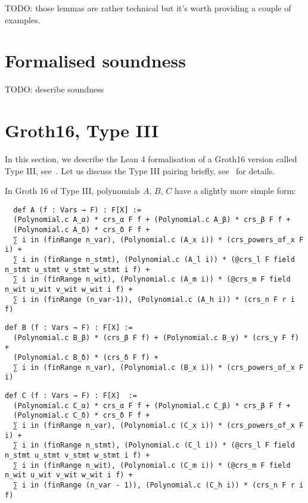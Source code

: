 \documentclass{article}
\theoremstyle{definition}
\theoremstyle{remark}
\begin{document}
TODO: those lemmas are rather technical but it's worth providing a couple of examples.

\section{Formalised soundness}

TODO: describe soundness

\section{Groth16, Type III}

In this section, we describe the Lean 4 formalisation of a Groth16 version called Type III, see~\cite{baghery2021another}.
Let us discuss the Type III pairing briefly, see~\cite{galbraith2008pairings} for details.

In Groth 16 of Type III, polynomials $A$, $B$, $C$ have a slightly more simple form:
\begin{lstlisting}
  def A (f : Vars → F) : F[X] :=
  (Polynomial.c A_α) * crs_α F f + (Polynomial.c A_β) * crs_β F f +
  (Polynomial.c A_δ) * crs_δ F f +
  ∑ i in (finRange n_var), (Polynomial.c (A_x i)) * (crs_powers_of_x F i) +
  ∑ i in (finRange n_stmt), (Polynomial.c (A_l i)) * (@crs_l F field n_stmt u_stmt v_stmt w_stmt i f) +
  ∑ i in (finRange n_wit), (Polynomial.c (A_m i)) * (@crs_m F field n_wit u_wit v_wit w_wit i f) +
  ∑ i in (finRange (n_var-1)), (Polynomial.c (A_h i)) * (crs_n F r i f)
\end{lstlisting}

\begin{lstlisting}
def B (f : Vars → F) : F[X] :=
  (Polynomial.c B_β) * (crs_β F f) + (Polynomial.c B_γ) * (crs_γ F f) +
  (Polynomial.c B_δ) * (crs_δ F f) +
  ∑ i in (finRange n_var), (Polynomial.c (B_x i)) * (crs_powers_of_x F i)
\end{lstlisting}

\begin{lstlisting}
def C (f : Vars → F) : F[X]  :=
  (Polynomial.c C_α) * crs_α F f + (Polynomial.c C_β) * crs_β F f +
  (Polynomial.c C_δ) * crs_δ F f +
  ∑ i in (finRange n_var), (Polynomial.c (C_x i)) * (crs_powers_of_x F i) +
  ∑ i in (finRange n_stmt), (Polynomial.c (C_l i)) * (@crs_l F field n_stmt u_stmt v_stmt w_stmt i f) +
  ∑ i in (finRange n_wit), (Polynomial.c (C_m i)) * (@crs_m F field n_wit u_wit v_wit w_wit i f) +
  ∑ i in (finRange (n_var - 1)), (Polynomial.c (C_h i)) * (crs_n F r i f)
\end{lstlisting}



\end{document}
